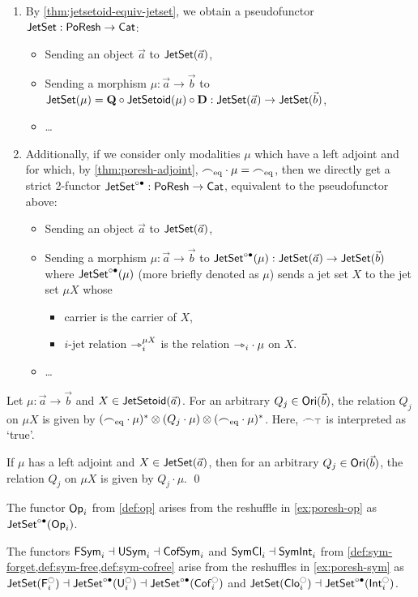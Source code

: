 \documentclass[a4paper]{memoir}
\begin{document}
\begin{definition}
\begin{enumerate}
		\item By \cref{thm:jetsetoid-equiv-jetset}, we obtain a pseudofunctor $\mathsf{JetSet} : \mathsf{PoResh} \to {\mathsf{Cat}}$:
		\begin{itemize}
			\item Sending an object $\vec a$ to $\mathsf{JetSet}(\vec a)$,
			\item Sending a morphism $\mu : \vec a \to \vec b$ to $\mathsf{JetSet}(\mu) = {\mathbf{Q}} \circ \mathsf{JetSetoid}(\mu) \circ {\mathbf{D}} : \mathsf{JetSet}(\vec a) \to \mathsf{JetSet}(\vec b)$,
			\item \ldots
		\end{itemize}
		
		\item Additionally, if we consider only modalities $\mu$ which have a left adjoint and for which, by \cref{thm:poresh-adjoint}, ${\frown}_{{\mathrm{eq}}} \cdot \mu = {\frown}_{{\mathrm{eq}}}$, then we directly get a strict 2-functor $\mathsf{JetSet} ^{\circ \bullet} : \mathsf{PoResh} \to {\mathsf{Cat}}$, equivalent to the pseudofunctor above:
		\begin{itemize}
			\item Sending an object $\vec a$ to $\mathsf{JetSet}(\vec a)$,
			\item Sending a morphism $\mu : \vec a \to \vec b$ to $\mathsf{JetSet}^{\circ \bullet}(\mu) : \mathsf{JetSet}(\vec a) \to \mathsf{JetSet}(\vec b)$ where $\mathsf{JetSet}^{\circ \bullet}(\mu)$ (more briefly denoted as $\mu$) sends a jet set $X$ to the jet set $\mu X$ whose
			\begin{itemize}
				\item carrier is the carrier of $X$,
				\item $i$-jet relation ${\rightarrowtriangle}_i^{\mu X}$ is the relation ${\rightarrowtriangle}_i \cdot \mu$ on $X$.
			\end{itemize}
			\item \ldots
		\end{itemize}
	\end{enumerate}
\end{definition}
\begin{corollary} \label{thm:poresh-jetsetoid:bind}
	Let $\mu : \vec a \to \vec b$ and $X \in \mathsf{JetSetoid}(\vec a)$.
	For an arbitrary $Q_j \in {\mathsf{Ori}}(\vec b)$, the relation $Q_j$ on $\mu X$ is given by $({\frown}_{{\mathrm{eq}}} \cdot \mu)^* \otimes (Q_j \cdot \mu) \otimes ({\frown}_{{\mathrm{eq}}} \cdot \mu)^*$.
	Here, ${\frown}_\top$ is interpreted as `true'.
	
	If $\mu$ has a left adjoint and $X \in \mathsf{JetSet}(\vec a)$, then for an arbitrary $Q_j \in {\mathsf{Ori}}(\vec b)$, the relation $Q_j$ on $\mu X$ is given by  $Q_j \cdot \mu$. \qed
\end{corollary}
\begin{example} \label{ex:poresh-op-jetset}
	The functor ${\mathsf{Op}}_i$ from \cref{def:op} arises from the reshuffle in \cref{ex:poresh-op} as $\mathsf{JetSet}^{\circ \bullet}({\mathsf{Op}}_i)$.
\end{example}
\begin{example} \label{ex:poresh-sym-jetset}
	The functors $\mathsf{FSym}_i \dashv \mathsf{USym}_i \dashv \mathsf{CofSym}_i$ and $\mathsf{SymCl}_i \dashv \mathsf{SymInt}_i$ from \cref{def:sym-forget,def:sym-free,def:sym-cofree} arise from the reshuffles in \cref{ex:poresh-sym} as $\jetset{\Fsymresh_i} \dashv \jetsetl{\Usymresh_i} \dashv \jetsetl{\Csymresh_i}$ and $\jetset{\UFsymresh_i} \dashv \jetsetl{\UCsymresh_i}$.
\end{example}
\end{document}
